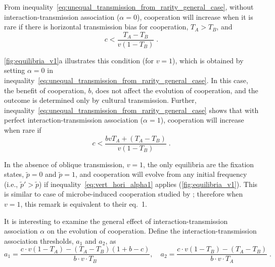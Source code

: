 \documentclass[12pt]{extarticle}
\begin{document}
From inequality~\ref{eq:unequal_transmission_from_rarity_general_case}, without interaction-transmission association ($\alpha=0$), cooperation will increase when it is rare if there is horizontal transmission bias for cooperation, $T_A>T_B$, and
\begin{equation}
\label{eq:vert_hori_alpha0}
c < \frac{T_A - T_B}{v(1-T_B)} \;.
\end{equation}

\autoref{fig:equilibria_v1}a illustrates this condition (for $v=1$), which is obtained by setting $\alpha=0$ in inequality~\ref{eq:unequal_transmission_from_rarity_general_case}.
In this case, the benefit of cooperation, $b$, does not affect the evolution of cooperation, and the outcome is determined only by  cultural transmission.
Further, inequality~\ref{eq:unequal_transmission_from_rarity_general_case} shows that with perfect interaction-transmission association ($\alpha=1$), cooperation will increase when rare if
\begin{equation}\label{eq:vert_hori_alpha1}
c < \frac{b v T_A + (T_A - T_B)}{v(1-T_B)} \;.
\end{equation}

In the absence of oblique transmission, $v=1$, the only equilibria are the fixation states, $\tilde{p}=0$ and $\tilde{p}=1$, and cooperation will evolve from any initial frequency (i.e., $\tilde{p}'>\tilde{p}$) if inequality~\ref{eq:vert_hori_alpha1} applies (\autoref{fig:equilibria_v1}).
This is similar to case of microbe-induced cooperation studied by \citet{lewin2017microbes}; therefore when $v=1$, this remark is equivalent to their eq.~1.

It is interesting to examine the general effect of interaction-transmission association $\alpha$ on the evolution of cooperation.
Define the interaction-transmission association thresholds, $a_1$ and $a_2$, as 
\begin{equation} \label{eq:boundries_assortative_meeting_general_case}
  a_1 = \frac{c\cdot v(1-T_A) -(T_A-T_B)(1+b-c)}{b\cdot v \cdot T_B}, \quad
  a_2 = \frac{c\cdot v(1-T_B)-(T_A-T_B)}{b\cdot v\cdot T_A} \;.
\end{equation}
\end{document}
